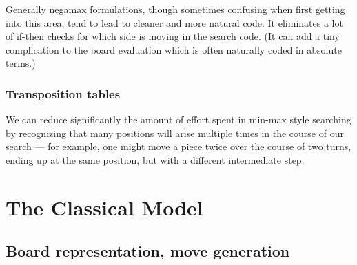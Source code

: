 \documentclass[10pt,dvipdfmx,letterpaper]{report}
\begin{document}
Generally negamax formulations, though sometimes confusing when first getting into
this area, tend to lead to cleaner and more natural code.  It eliminates a lot of
if-then checks for which side is moving in the search code.  (It can add a
tiny complication to the board evaluation which is often naturally coded in absolute terms.)

\begin{center}
\qquad
{}
\end{center}

\section{Transposition tables}

We can reduce significantly the amount of effort spent in min-max style searching
by recognizing that many positions will arise multiple times in the course of our
search --- for example, one might move a piece twice over the course of two turns, ending up at
the same position, but with a different intermediate step.

\part{The Classical Model}


\chapter{Board representation, move generation}
\label{chap-board-move}
\end{document}

